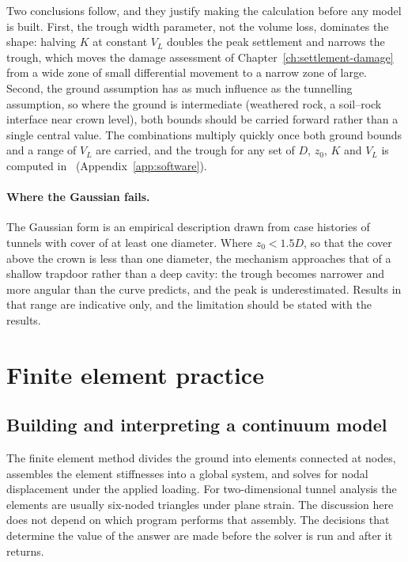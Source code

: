 Two conclusions follow, and they justify making the calculation
before any model is built. First, the trough width parameter, not the volume loss,
dominates the shape: halving $K$ at constant $V_L$ doubles the peak settlement
and narrows the trough, which moves the damage assessment of
Chapter~\ref{ch:settlement-damage} from a wide zone of small differential
movement to a narrow zone of large. Second, the ground assumption has as much
influence as the tunnelling assumption, so where the ground is
intermediate (weathered rock, a soil--rock interface near crown level),
both bounds should be carried forward rather than a single central value.
The combinations multiply quickly once both ground bounds and a range of
$V_L$ are carried, and the trough for any set of $D$, $z_0$, $K$ and $V_L$ is
computed in \companionname\ (Appendix~\ref{app:software}).

\paragraph{Where the Gaussian fails.}
The Gaussian form is an empirical description drawn from case histories of
tunnels with cover of at least one diameter. Where $z_0 < 1.5D$, so that the cover
above the crown is less than one diameter, the mechanism approaches that of a
shallow trapdoor rather than a deep cavity: the trough becomes narrower and
more angular than the curve predicts, and the peak is underestimated. Results
in that range are indicative only, and the limitation should be stated with
the results.

\section{Finite element practice}
\label{sec:finite-element-practice}

\subsection{Building and interpreting a continuum model}
\label{sec:finite-element-modelling}

The finite element method divides the ground into elements connected at nodes,
assembles the element stiffnesses into a global system, and solves for nodal
displacement under the applied loading. For two-dimensional tunnel analysis the
elements are usually six-noded triangles under plane strain. The discussion here
does not depend on which program performs that assembly. The decisions that
determine the value of the answer are made before the solver is
run and after it returns.

